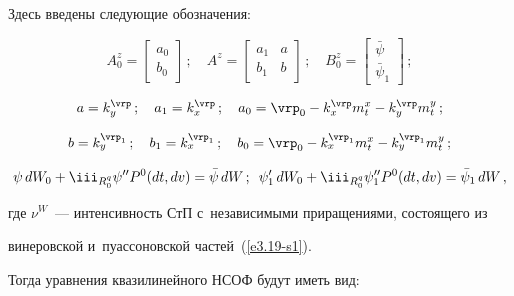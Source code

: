 Здесь введены следующие обозначения:

    $$

    A_0^z = \begin{bmatrix}

     a_0\\ 

     b_0\end{bmatrix}\,;\quad A^z =\begin{bmatrix}

      a_1&a\\ 

      b_1&b\end{bmatrix}\,;\quad 

      B_0^z =\begin{bmatrix} \bar \psi\\

      \bar\psi_1\end{bmatrix}\,;

      $$

    $$

    a= k_y^\vrp\,;\quad a_1 = k_x^\vrp\,;\quad a_0 =\vrp_0 - k_x^\vrp m_t^x - k_y^\vrp m_t^y\,;

    $$

$$

    b= k_y^{\vrp_1}\,; \quad b_1=k_x^{\vrp_1}\,;\quad

    b_0=\vrp_0 -k_x^{\vrp_1} m_t^x -k_y^{\vrp_1}m_t^y\,; %

$$

\begin{equation}

\psi\, dW_0 + \iii_{R_0^q} \psi'' P^0 (dt, dv) =\bar \psi \, dW\,;\enskip 

\psi_1' \,dW_0 + \iii_{R_0^q} \psi_1'' P^0 (dt, dv)= \bar \psi_1 \,dW\,,

\label{e3.19-s1}

\end{equation}

где $\nu^W$~--- интенсивность СтП с~независимыми приращениями, состоящего из 

винеровской и~пуассоновской частей~(\ref{e3.19-s1}). 

Тогда уравнения квазилинейного НСОФ будут иметь вид:

